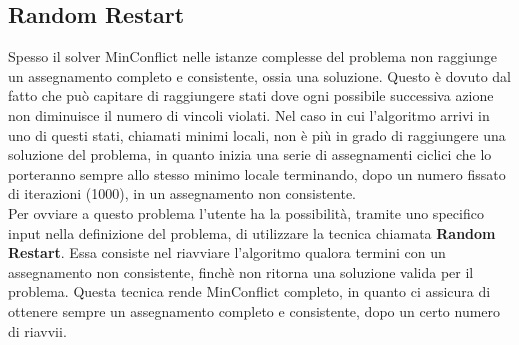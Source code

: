 \subsection{Random Restart}
\label{RR}
Spesso il solver MinConflict nelle istanze complesse del problema non raggiunge un assegnamento completo e consistente, ossia una soluzione. Questo è dovuto dal fatto che può capitare di raggiungere stati dove ogni possibile successiva azione non diminuisce il numero di vincoli violati. Nel caso in cui l'algoritmo arrivi in uno di questi stati, chiamati minimi locali, non è più in grado di raggiungere una soluzione del problema, in quanto inizia una serie di assegnamenti ciclici che lo porteranno sempre allo stesso minimo locale terminando, dopo un numero fissato di iterazioni (1000), in un assegnamento non consistente.\\
Per ovviare a questo problema l'utente ha la possibilità, tramite uno specifico input nella definizione del problema, di utilizzare la tecnica chiamata \textbf{Random Restart}. Essa consiste nel riavviare l'algoritmo qualora termini con un assegnamento non consistente, finchè non ritorna una soluzione valida per il problema. Questa tecnica rende MinConflict completo, in quanto ci assicura di ottenere sempre un assegnamento completo e consistente, dopo un certo numero di riavvii.\\



 
